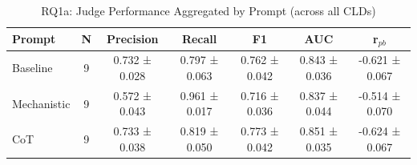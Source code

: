 \begin{table}[htbp]
\centering
\caption{RQ1a: Judge Performance Aggregated by Prompt (across all CLDs)}
\label{tab:rq1a_by_prompt}
\begin{tabular}{lcccccc}
\toprule
\textbf{Prompt} & \textbf{N} & \textbf{Precision} & \textbf{Recall} & \textbf{F1} & \textbf{AUC} & \textbf{r$_{pb}$} \\
\midrule
Baseline & 9 & 0.732 ± 0.028 & 0.797 ± 0.063 & 0.762 ± 0.042 & 0.843 ± 0.036 & -0.621 ± 0.067 \\
Mechanistic & 9 & 0.572 ± 0.043 & 0.961 ± 0.017 & 0.716 ± 0.036 & 0.837 ± 0.044 & -0.514 ± 0.070 \\
CoT & 9 & 0.733 ± 0.038 & 0.819 ± 0.050 & 0.773 ± 0.042 & 0.851 ± 0.035 & -0.624 ± 0.067 \\
\bottomrule
\end{tabular}
\end{table}